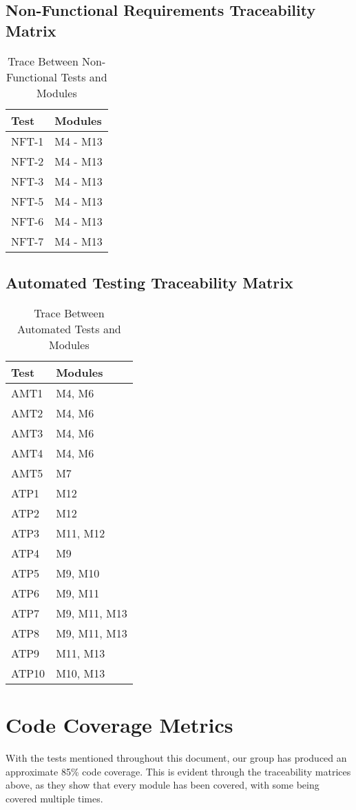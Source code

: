 \documentclass[12pt, titlepage]{article}
\begin{document}
\newpage

\subsection{Non-Functional Requirements Traceability Matrix}
\begin{table}[H]
\centering
\begin{tabular}{p{} p{}}
\toprule
\textbf{Test} & \textbf{Modules}\\
\midrule
NFT-1 & M4 - M13\\
NFT-2 & M4 - M13\\
NFT-3 & M4 - M13\\
NFT-5 & M4 - M13\\
NFT-6 & M4 - M13\\
NFT-7 & M4 - M13\\
\bottomrule
\end{tabular}
\caption{Trace Between Non-Functional Tests and Modules}
\label{TblNFTM}
\end{table}

\newpage

\subsection{Automated Testing Traceability Matrix}
\begin{table}[H]
\centering
\begin{tabular}{p{} p{}}
\toprule
\textbf{Test} & \textbf{Modules}\\
\midrule
AMT1 & M4, M6\\
AMT2 & M4, M6\\
AMT3 & M4, M6\\
AMT4 & M4, M6\\
AMT5 & M7\\
ATP1 & M12 \\
ATP2 & M12 \\
ATP3 & M11, M12 \\
ATP4 & M9 \\
ATP5 & M9, M10 \\
ATP6 & M9, M11 \\
ATP7 & M9, M11, M13 \\
ATP8 & M9, M11, M13 \\
ATP9 & M11, M13 \\
ATP10 & M10, M13 \\
\bottomrule
\end{tabular}
\caption{Trace Between Automated Tests and Modules}
\label{TblATM}
\end{table}

\newpage
	
\section{Code Coverage Metrics}	

With the tests mentioned throughout this document, our group has produced an approximate 85\% code coverage. This is evident through the traceability matrices above, as they show that every module has been covered, with some being covered multiple times.
\end{document}
